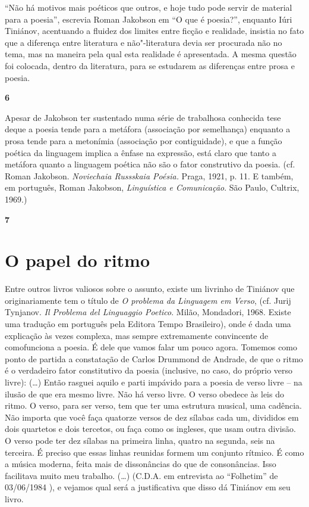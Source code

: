 ``Não há motivos mais poéticos que outros, e hoje tudo pode servir de
material para a poesia'', escrevia Roman Jakobson em ``O que é
poesia?'', enquanto Iúri Tiniánov, acentuando a fluidez dos limites
entre ficção e realidade, insistia no fato que a diferença entre
literatura e não"-literatura devia ser procurada não no tema, mas na
maneira pela qual esta realidade é apresentada. A mesma questão foi
colocada, dentro da literatura, para se estudarem as diferenças entre
prosa e poesia.

\textbf{6}

Apesar de Jakobson ter sustentado numa série de trabalhosa conhecida
tese deque a poesia tende para a metáfora (associação por semelhança)
enquanto a prosa tende para a metonímia (associação por contiguidade), e
que a função poética da linguagem implica a ênfase na expressão, está
claro que tanto a metáfora quanto a linguagem poética não são o fator
construtivo da poesia. (cf. Roman Jakobson. \emph{Noviechaia Russskaia
Poésia.} Praga, 1921, p. 11. E também, em português, Roman Jakobson,
\emph{Linguística e Comunicação}. São Paulo, Cultrix, 1969.)

\textbf{7 }

\section{O papel do ritmo}

Entre outros livros valiosos sobre o assunto, existe um livrinho de
Tiniánov que originariamente tem o título de \emph{O problema da
Linguagem em Verso}, (cf. Jurij Tynjanov. \emph{Il Problema del
Linguaggio Poetico}. Milão, Mondadori, 1968. Existe uma tradução em
português pela Editora Tempo Brasileiro), onde é dada uma explicação às
vezes complexa, mas sempre extremamente convincente de comofunciona a
poesia. É dele que vamos falar um pouco agora. Tomemos como ponto de
partida a constatação de Carlos Drummond de Andrade, de que o ritmo é o
verdadeiro fator constitutivo da poesia (inclusive, no caso, do próprio
verso livre): (\ldots{}) Então rasguei aquilo e parti impávido para a poesia
de verso livre -- na ilusão de que era mesmo livre. Não há verso livre.
O verso obedece às leis do ritmo. O verso, para ser verso, tem que ter
uma estrutura musical, uma cadência. Não importa que você faça quatorze
versos de dez sílabas cada um, divididos em dois quartetos e dois
tercetos, ou faça como os ingleses, que usam outra divisão. O verso pode
ter dez sílabas na primeira linha, quatro na segunda, seis na terceira.
É preciso que essas linhas reunidas formem um conjunto rítmico. É como a
música moderna, feita mais de dissonâncias do que de consonâncias. Isso
facilitava muito meu trabalho. (\ldots{}) (C.D.A. em entrevista ao
``Folhetim'' de 03/06/1984 ), e vejamos qual será a justificativa que
disso dá Tiniánov em seu livro.

